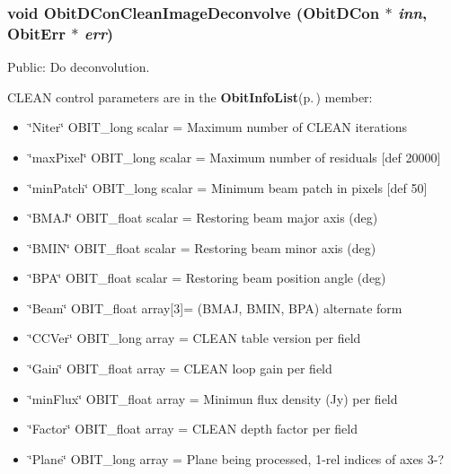 \subsubsection{\setlength{\rightskip}{0pt plus 5cm}void Obit\-DCon\-Clean\-Image\-Deconvolve ({\bf Obit\-DCon} $\ast$ {\em inn}, {\bf Obit\-Err} $\ast$ {\em err})}\label{ObitDConCleanImage_8h_a9}


Public: Do deconvolution. 

CLEAN control parameters are in the {\bf Obit\-Info\-List}{\rm (p.\,\pageref{structObitInfoList})} member: \begin{itemize}
\item \char`\"{}Niter\char`\"{} OBIT\_\-long scalar = Maximum number of CLEAN iterations \item \char`\"{}max\-Pixel\char`\"{} OBIT\_\-long scalar = Maximum number of residuals [def 20000] \item \char`\"{}min\-Patch\char`\"{} OBIT\_\-long scalar = Minimum beam patch in pixels [def 50] \item \char`\"{}BMAJ\char`\"{} OBIT\_\-float scalar = Restoring beam major axis (deg) \item \char`\"{}BMIN\char`\"{} OBIT\_\-float scalar = Restoring beam minor axis (deg) \item \char`\"{}BPA\char`\"{} OBIT\_\-float scalar = Restoring beam position angle (deg) \item \char`\"{}Beam\char`\"{} OBIT\_\-float array[3]= (BMAJ, BMIN, BPA) alternate form \item \char`\"{}CCVer\char`\"{} OBIT\_\-long array = CLEAN table version per field \item \char`\"{}Gain\char`\"{} OBIT\_\-float array = CLEAN loop gain per field \item \char`\"{}min\-Flux\char`\"{} OBIT\_\-float array = Minimun flux density (Jy) per field \item \char`\"{}Factor\char`\"{} OBIT\_\-float array = CLEAN depth factor per field \item \char`\"{}Plane\char`\"{} OBIT\_\-long array = Plane being processed, 1-rel indices of axes 3-? 
\end{itemize}

